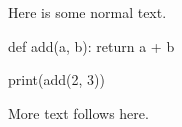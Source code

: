 \documentclass{article}
\begin{document}
Here is some normal text.

\begin{MyCodeBlock}
def add(a, b):
    return a + b

print(add(2, 3))
\end{MyCodeBlock}

More text follows here.
\end{document}
